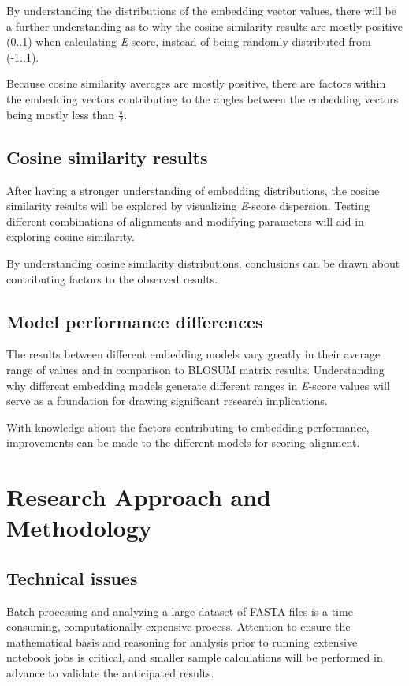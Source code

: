 \documentclass[
	letterpaper, %
	10pt, %
]{journalArticle}
\begin{document}
By understanding the distributions of the embedding vector values, there will be a further understanding as to why the cosine similarity results are mostly positive (0..1) when calculating \textit{E}-score, instead of being randomly distributed from (-1..1).

Because cosine similarity averages are mostly positive, there are factors within the embedding vectors contributing to the angles between the embedding vectors being mostly less than \(\frac{\pi}{2}\).

\subsection{Cosine similarity results}

After having a stronger understanding of embedding distributions, the cosine similarity results will be explored by visualizing \textit{E}-score dispersion. Testing different combinations of alignments and modifying parameters will aid in exploring cosine similarity.

By understanding cosine similarity distributions, conclusions can be drawn about contributing factors to the observed results.

\subsection{Model performance differences}

The results between different embedding models vary greatly in their average range of values and in comparison to BLOSUM \autocite{Henikoff:1992} matrix results. Understanding why different embedding models generate different ranges in \textit{E}-score values will serve as a foundation for drawing significant research implications. 

With knowledge about the factors contributing to embedding performance, improvements can be made to the different models for scoring alignment.

\section{Research Approach and Methodology}

\subsection{Technical issues}
Batch processing and analyzing a large dataset of FASTA files is a time-consuming, computationally-expensive process. Attention to ensure the mathematical basis and reasoning for analysis prior to running extensive notebook jobs is critical, and smaller sample calculations will be performed in advance to validate the anticipated results.
\end{document}
